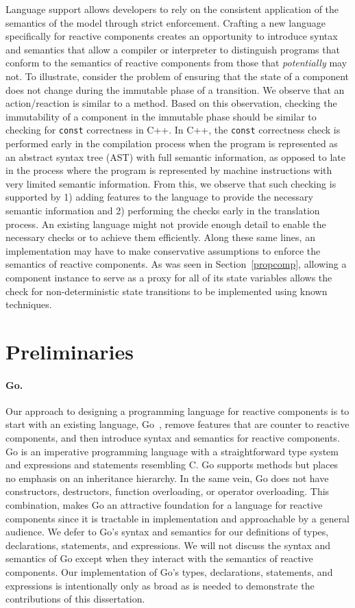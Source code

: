 Language support allows developers to rely on the consistent application of the semantics of the model through strict enforcement.
Crafting a new language specifically for reactive components creates an opportunity to introduce syntax and semantics that allow a compiler or interpreter to distinguish programs that conform to the semantics of reactive components from those that \emph{potentially} may not.
To illustrate, consider the problem of ensuring that the state of a component does not change during the immutable phase of a transition.
We observe that an action/reaction is similar to a method.
Based on this observation, checking the immutability of a component in the immutable phase should be similar to checking for \verb+const+ correctness in C++.
In C++, the \verb+const+ correctness check is performed early in the compilation process when the program is represented as an abstract syntax tree (AST) with full semantic information, as opposed to late in the process where the program is represented by machine instructions with very limited semantic information.
From this, we observe that such checking is supported by 1) adding features to the language to provide the necessary semantic information and 2) performing the checks early in the translation process.
An existing language might not provide enough detail to enable the necessary checks or to achieve them efficiently.
Along these same lines, an implementation may have to make conservative assumptions to enforce the semantics of reactive components.
As was seen in Section~\ref{propcomp}, allowing a component instance to serve as a proxy for all of its state variables allows the check for non-deterministic state transitions to be implemented using known techniques.

\section{Preliminaries}

\paragraph{Go.}
Our approach to designing a programming language for reactive components is to start with an existing language, Go~\cite{go}, remove features that are counter to reactive components, and then introduce syntax and semantics for reactive components.
Go is an imperative programming language with a straightforward type system and expressions and statements resembling C.
Go supports methods but places no emphasis on an inheritance hierarchy.
In the same vein, Go does not have constructors, destructors, function overloading, or operator overloading.
This combination, makes Go an attractive foundation for a language for reactive components since it is tractable in implementation and approachable by a general audience.
We defer to Go's syntax and semantics for our definitions of types, declarations, statements, and expressions.
We will not discuss the syntax and semantics of Go except when they interact with the semantics of reactive components.
Our implementation of Go's types, declarations, statements, and expressions is intentionally only as broad as is needed to demonstrate the contributions of this dissertation.

